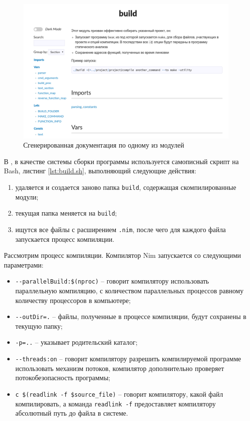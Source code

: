 \begin{figure}[!hbtp]
    \includegraphics[width=\textwidth,height=\textheight,keepaspectratio]{images/nim_doc_gen.png}
    \caption{Сгенерированная документация по одному из модулей {\ProgModule}\label{fig:nim-doc-gen}}
\end{figure}


В {\ProgModule}, в качестве системы сборки программы используется самописный скрипт на Bash, 
листинг \autoref{lst:build.sh}, выполняющий следующие действия:
\begin{enumerate}[label={\arabic*)}]
    \item удаляется и создается заново папка \verb|build|, содержащая скомпилированные модули;
    \item текущая папка меняется на \verb|build|;
    \item ищутся все файлы с расширением \verb|.nim|, после чего для каждого файла
        запускается процесс компиляции.
\end{enumerate}

Рассмотрим процесс компиляции. Компилятор Nim запускается со следующими параметрами:
\begin{itemize}
    \item \verb|--parallelBuild:$(nproc)| -- говорит компилятору 
        использовать параллельную компиляцию, с количеством параллельных процессов равному
        количеству процессоров в компьютере;
    \item \verb|--outDir=.| -- файлы, полученные в процессе компиляции, будут сохранены в 
        текущую папку;
    \item \verb|-p=..| -- указывает родительский каталог;
    \item \verb|--threads:on| -- говорит компилятору разрешить компилируемой программе использовать
        механизм потоков, компилятор дополнительно проверяет потокобезопасность программы;
    \item \verb|с $(readlink -f $source_file)| -- говорит компилятору, какой файл компилировать,
        а команда \verb|readlink -f| предоставляет компилятору абсолютный путь до файла в системе.
\end{itemize}

